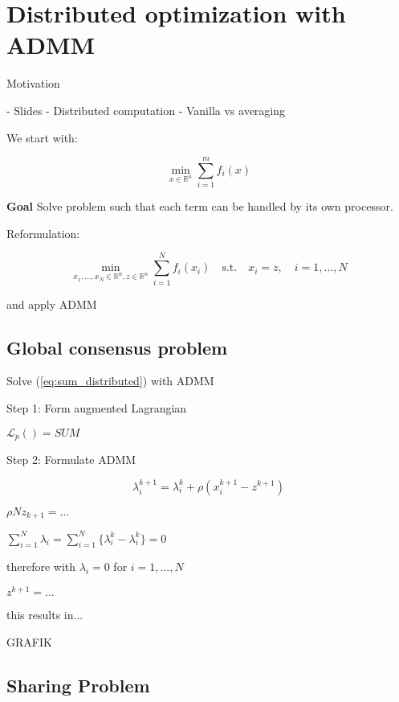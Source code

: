 \section{Distributed optimization with ADMM}

Motivation

- Slides
- Distributed computation
- Vanilla vs averaging

We start with:

$$	\min_{x \in \mathbb{R}^{n}} \sum_{i = 1}^{m} f_i(x) $$

\textbf{Goal} Solve problem such that each term can be handled by its own processor.

Reformulation:


\begin{equation}
	\min_{x_1,\dots,x_N \in \mathbb{R}^{n}, z \in \mathbb{R}^{n}} \sum_{i = 1}^{N} f_i(x_i)
	\quad\text{s.t.}\quad x_i = z,\quad i = 1,\dots,N
	\label{eq:sum_distributed}
\end{equation}

and apply ADMM

\subsection{Global consensus problem}

Solve (\ref{eq:sum_distributed}) with ADMM

Step 1: Form augmented Lagrangian

$\mathcal{L}_p()=SUM$

Step 2: Formulate ADMM

%
%
$$ \lambda_i^{k+1}=\lambda_i^k+\rho(x_i^{k+1}-z^{k+1})$$

$\rho N z_{k+1} =\dots$

$\sum_{i = 1}^{N} \lambda_i = \sum_{i = 1}^{N}\{\lambda_i^k-\lambda_i^k\}=0$

therefore with $\lambda_i = 0$ for $i=1,\dots,N$

$z^{k+1} = ...$

this results in...

GRAFIK

\subsection{Sharing Problem}

